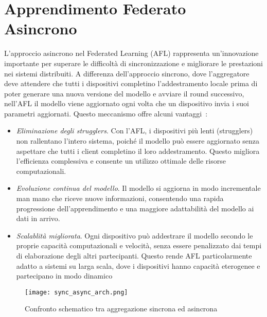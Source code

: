 \documentclass[a4paper, oneside, openright]{report}
\let\oldsection\section
\renewcommand{\section}{\newpage\oldsection}
\begin{document}
\section{Apprendimento Federato Asincrono}\label{sub:sync-async}
L'approccio asincrono nel Federated Learning (AFL) rappresenta un’innovazione importante per superare le difficoltà di sincronizzazione e migliorare le prestazioni nei sistemi distribuiti. A differenza dell’approccio sincrono, dove l'aggregatore deve attendere che tutti i dispositivi completino l'addestramento locale prima di poter generare una nuova versione del modello e avviare il round successivo, nell'AFL il modello viene aggiornato ogni volta che un dispositivo invia i suoi parametri aggiornati. Questo meccanismo offre alcuni vantaggi~\cite{DBLP:journals/corr/abs-1903-03934}:
\begin{itemize}
\item \textit{Eliminazione degli strugglers}. Con l’AFL, i dispositivi più lenti (strugglers) non rallentano l'intero sistema, poiché il modello può essere aggiornato senza aspettare che tutti i client completino il loro addestramento. Questo migliora l'efficienza complessiva e consente un utilizzo ottimale delle risorse computazionali.
\item \textit{Evoluzione continua del modello}. Il modello si aggiorna in modo incrementale man mano che riceve nuove informazioni, consentendo una rapida progressione dell’apprendimento e una maggiore adattabilità del modello ai dati in arrivo.
\item \textit{Scalablità migliorata}. Ogni dispositivo può addestrare il modello secondo le proprie capacità computazionali e velocità, senza essere penalizzato dai tempi di elaborazione degli altri partecipanti. Questo rende AFL particolarmente adatto a sistemi su larga scala, dove i dispositivi hanno capacità eterogenee e partecipano in modo dinamico
\end{itemize}


\begin{figure}[h]
\centering
\texttt{[image: sync\_async\_arch.png]}
\caption{Confronto schematico tra aggregazione sincrona ed asincrona} \label{fig:sync-async}
\end{figure}
\end{document}
